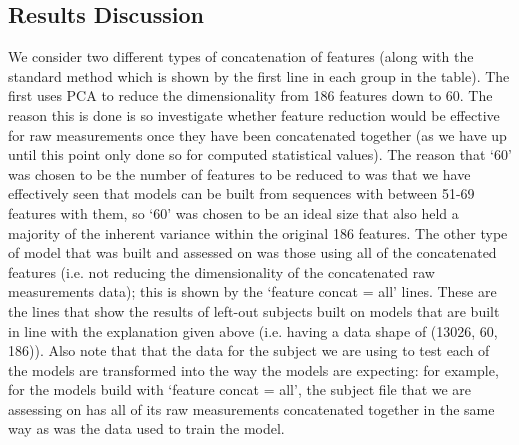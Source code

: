 \documentclass[12pt,twoside]{report}
\begin{document}
\subsection{Results Discussion}

\quad We consider two different types of concatenation of features (along with the standard method which is shown by the first line in each group in the table). The first uses PCA to reduce the dimensionality from 186 features down to 60. The reason this is done is so investigate whether feature reduction would be effective for raw measurements once they have been concatenated together (as we have up until this point only done so for computed statistical values). The reason that ‘60’ was chosen to be the number of features to be reduced to was that we have effectively seen that models can be built from sequences with between 51-69 features with them, so ‘60’ was chosen to be an ideal size that also held a majority of the inherent variance within the original 186 features. The other type of model that was built and assessed on was those using all of the concatenated features (i.e. not reducing the dimensionality of the concatenated raw measurements data); this is shown by the ‘feature concat = all’ lines. These are the lines that show the results of left-out subjects built on models that are built in line with the explanation given above (i.e. having a data shape of (13026, 60, 186)). Also note that that the data for the subject we are using to test each of the models are transformed into the way the models are expecting: for example, for the models build with ‘feature concat = all’, the subject file that we are assessing on has all of its raw measurements concatenated together in the same way as was the data used to train the model.\\
\end{document}
